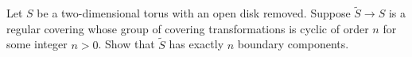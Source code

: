 Let $S$ be a two-dimensional torus with an open disk removed. Suppose
$\tilde{S}\rightarrow S$ is a regular covering whose group of covering
transformations is cyclic of order $n$ for some integer $n>0$. Show
that $\tilde{S}$ has exactly $n$ boundary components.
